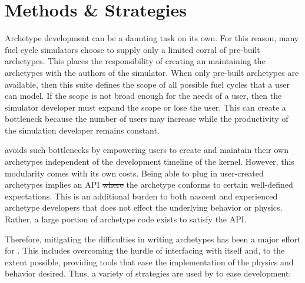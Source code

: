 \section{Methods \& Strategies}
\label{sec-methods}

Archetype development can be a daunting task on its own. For this reason, 
many fuel cycle simulators choose to supply only a limited corral of 
pre-built archetypes. This places the responsibility of creating an maintaining 
the archetypes with the authors of the simulator.  When only pre-built archetypes are available, then this suite defines the scope 
of all possible fuel cycles that a user can model. If the scope is not broad 
enough for the needs of a user, then the simulator developer must expand the 
scope or lose the user.  This can create a bottleneck because the number of users 
may increase while the productivity of the simulation developer remains constant.

\Cyclus avoids such bottlenecks by empowering users to create and maintain 
their own archetypes independent of the development timeline of the \cyclus 
kernel. However, this modularity comes with its own costs. Being able to 
plug in user-created archetypes implies an \gls{API} \sout{where}  
the archetype conforms to certain well-defined expectations. This is an 
additional burden to both nascent and experienced archetype developers that 
does not effect the underlying behavior or physics. Rather, a large portion 
of archetype code exists to satisfy the \cyclus \gls{API}. 

Therefore, mitigating the difficulties in writing archetypes has been a major effort 
for \cyclus. This includes overcoming the hurdle of interfacing with 
\cyclus itself and, to the extent possible, providing tools that 
ease the implementation of the physics and behavior desired. Thus, 
a variety of strategies are used by \cyclus to ease development: 

